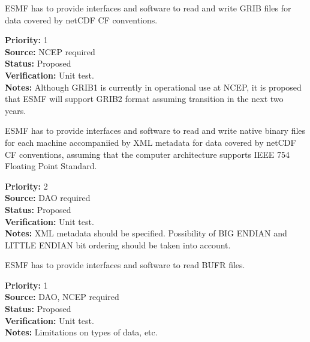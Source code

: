 
ESMF has to provide interfaces and software to read and write GRIB
files for data covered by netCDF CF conventions. 

\begin{reqlist}
{\bf Priority:} 1 \\
{\bf Source:} NCEP required \\
{\bf Status:} Proposed \\
{\bf Verification:} Unit test. \\
{\bf Notes:} Although GRIB1 is currently in operational use at NCEP,
it is proposed that ESMF will support GRIB2 format assuming transition
in the next two years.
\end{reqlist}


ESMF has to provide interfaces and software to read and write native
binary files for each machine accompaniied by XML metadata for data
covered by netCDF CF conventions, assuming that the computer architecture
supports IEEE 754 Floating Point Standard. 

\begin{reqlist}
{\bf Priority:} 2 \\
{\bf Source:} DAO required \\
{\bf Status:} Proposed \\
{\bf Verification:} Unit test. \\
{\bf Notes:} XML metadata should be specified. Possibility of BIG
ENDIAN and LITTLE ENDIAN bit ordering should be taken into account.
\end{reqlist}




ESMF has to provide interfaces and software to read BUFR files.

\begin{reqlist}
{\bf Priority:} 1 \\
{\bf Source:} DAO, NCEP required \\
{\bf Status:} Proposed \\
{\bf Verification:} Unit test. \\
{\bf Notes:} Limitations on types of data, etc.
\end{reqlist}



